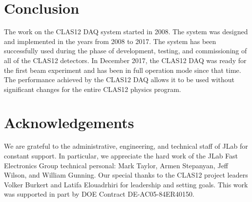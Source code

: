 \section{Conclusion}

The work on the CLAS12 DAQ system started in 2008. The system was designed and implemented in the years from 2008 to 2017. The system has been successfully used during the phase of development, testing, and commissioning of all of the CLAS12 detectors. In December 2017, the CLAS12 DAQ was ready for the first beam experiment and has been in full operation mode since that time. The performance achieved by the CLAS12 DAQ allows it to be used without significant changes for the entire CLAS12 physics program.

\section{Acknowledgements}

We are grateful to the administrative, engineering, and technical staff of JLab for constant support. In particular, we appreciate the hard work of the JLab Fast Electronics Group technical personal: Mark Taylor, Armen Stepanyan, Jeff Wilson, and William Gunning. Our special thanks to the CLAS12 project leaders Volker Burkert and Latifa Elouadrhiri for leadership and setting goals. This work was supported in part by DOE Contract DE-AC05-84ER40150.


